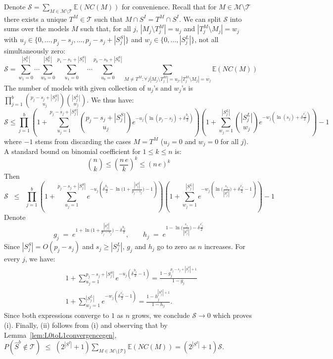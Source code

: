 \documentclass[aos]{imsart}
\theoremstyle{plain}
\newcommand{\E}{\mathbb{E}}
\begin{document}
\begin{supplement}
Denote $\mathcal{S}= \sum_{M \in \mathcal{M}\setminus \mathcal{T}} \E\left(NC(M)\right)$ for convenience. Recall that for $M \in \mathcal{M}\setminus \mathcal{T}$ there exists a unique $T^M\in\mathcal{T}$ such that $M\cap S^I=T^M\cap S^I$.  We can split $\mathcal{S}$ into sums over the models $M$ such that, for all $j$, $|M_j\setminus T^M_j|=u_j$ and $|T^M_j\setminus M_j|=w_j$ with $u_j \in \{0,\ldots,p_j-s_j,\ldots,p_j-s_j+|S_j^S|\}$ and $w_j \in \{0,\ldots,|S^L_j|\}$, not all simultaneously zero:
$$\mathcal{S} =\sum_{w_1=0}^{|S^L_1|}\cdots\sum_{w_b=0}^{|S^L_b|}\sum_{u_1=0}^{p_1-s_1+|S_1^S|}\cdots\sum_{u_b=0}^{p_b-s_b+|S_b^S|}\sum_{M \neq T^M:\forall \,j |M_j\setminus T^M_j|=u_j, |T^M_j\setminus M_j|=w_j } \E\left(NC(M)\right)$$
The number of models with given collection of $u_j$'s and $w_j$'s is $\prod_{j=1}^b {p_j-s_j+|S_j^S| \choose u_j}{|S_j^L|\choose w_j}$. We thus have:
\begin{equation*}
    \mathcal{S} \leq \prod_{j=1}^b\left(1+\sum_{u_j=1}^{p_j-s_j+|S_j^S|}{p_j-s_j +|S_j^S|\choose u_j}e^{- u_j(\ln(p_j-s_j)+\delta \tfrac{b_j}{2})}\right)\left(1+
    \sum_{w_j=1}^{|S_j^L|}{|S_j^L| \choose w_j}
    e^{-w_j(\ln(s_j)+\delta \tfrac{c^{\prime}_j}{2})}\right) - 1
\end{equation*}
where $-1$ stems from discarding the cases $M=T^M$ ($u_j=0$ and $w_j=0$ for all $j$). A standard bound on binomial coefficient for $1\leq k\leq n$ is:
\begin{equation*}
    {n \choose k} \leq \left(\frac{n\,e}{k}\right)^k \leq \left(n\,e\right)^k
\end{equation*}
Then
\begin{equation*}
    \mathcal{S} \;\;\leq\;\; \prod_{j=1}^b\left(1+\sum_{u_j=1}^{p_j-s_j+|S_j^S|}e^{-u_j\left(\delta \tfrac{b_j}{2}-\ln\big(1+\frac{|S^S_j|}{p_j-s_j}\big)-1\right)}\right)\left(1+
    \sum_{w_j=1}^{|S_j^L|}    e^{-w_j\left(\ln\big(\frac{s_j}{|S_j^L|}\big)+\delta \tfrac{c^{\prime}_j}{2}-1\right)}\right) - 1
\end{equation*}
Denote
$$
g_j\;=\;e^{1+\ln\big(1+\frac{|S^S_j|}{p_j-s_j}\big)-\delta \tfrac{b_j}{2}},\qquad h_j\;=\;e^{1-\ln\big(\frac{s_j}{|S_j^L|}\big)-\delta \tfrac{c^{\prime}_j}{2}}
$$
Since $|S^S_j|=O(p_j-s_j)$ and $s_j\geq|S_j^L|$, $g_j$ and $h_j$ go to zero as $n$ increases.
For every $j$, we have:
\begin{align*}
    &1+\sum_{u_j=1}^{p_j-s_j+|S_j^S|}e^{-u_j\left(\delta \tfrac{b_j}{2}-1\right)}
    =\frac{1-g_j^{p_j-s_j+|S_j^S|+1}}{1-g_j} \\
    &1+\sum_{w_j=1}^{|S_j^L|}    e^{-w_j\left(\delta \tfrac{c^{\prime}_j}{2}-1\right)} =\frac{1-h_j^{|S_j^L|+1}}{1-h_j}.
\end{align*}
Since both expressions converge to $1$ as $n$ grows, we conclude $\mathcal S\to 0$ which proves (i). Finally, (ii) follows from (i) and observing that by Lemma~\ref{lem:L0toL1convergencegen}, 
$P(\hat{S}^{b} \not\in \mathcal{T} ) \,\,\leq \,\, (2^{|S^I|}+1) \sum_{M \in \mathcal{M}\setminus \{\mathcal{T}\}} \E\left(NC(M)\right) = (2^{|S^I|}+1) \mathcal{S}$.



\end{supplement}
\end{document}
